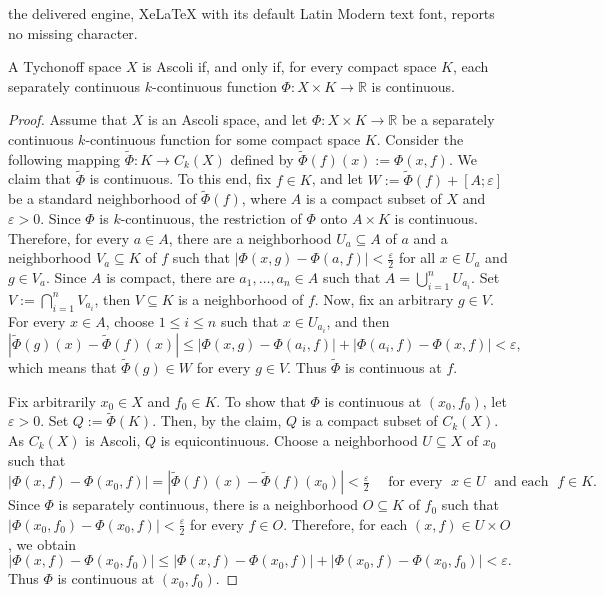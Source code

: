 \documentclass[10pt,a4paper]{amsart}
\newcommand{\CC}{C_k}
\newcommand{\IR}{\mathbb{R}}
\newcommand{\e}{\varepsilon}
\begin{document}
the delivered engine, XeLaTeX with its default Latin Modern text font, reports no missing character.
\begin{theorem} \label{t:Acoli-scf}
A Tychonoff space $X$ is Ascoli if, and only if, for every compact space $K$, each separately continuous $k$-continuous function $\Phi:X\times K\to \IR$ is continuous.
\end{theorem}

\begin{proof}
Assume that $X$ is an Ascoli space, and let $\Phi:X\times K\to \IR$ be a separately continuous $k$-continuous function for some compact space $K$. Consider the following mapping $\tilde\Phi: K\to \CC(X)$ defined by $\tilde\Phi(f)(x):=\Phi(x,f)$. We claim that $\tilde\Phi$ is continuous. To this end, fix $f\in K$, and let $W:=\tilde\Phi(f)+[A;\e]$ be a standard neighborhood of $\tilde\Phi(f)$, where  $A$ is a compact subset of $X$ and $\e>0$. Since $\Phi$ is $k$-continuous, the restriction of $\Phi$ onto $A\times K$ is continuous. Therefore, for every $a\in A$, there are a neighborhood $U_a\subseteq A$ of $a$ and a neighborhood $V_a\subseteq K$ of $f$ such that $|\Phi(x,g)-\Phi(a,f)|<\tfrac{\e}{2}$ for all $x\in U_a$ and $g\in V_a$. Since $A$ is compact, there are $a_1,\dots,a_n\in A$ such that $A=\bigcup_{i=1}^n U_{a_i}$. Set $V:=\bigcap_{i=1}^n V_{a_i}$, then $V\subseteq K$ is a neighborhood of $f$. Now, fix an arbitrary $g\in V$. For every $x\in A$, choose $1\leq i\leq n$ such that $x\in U_{a_i}$, and then
\[
|\tilde\Phi(g)(x)-\tilde\Phi(f)(x)|\leq |\Phi(x,g)-\Phi(a_i,f)|+|\Phi(a_i,f)-\Phi(x,f)|<\e,
\]
which means that  $\tilde\Phi(g)\in W$ for every $g\in V$. Thus $\tilde \Phi$ is continuous at $f$.

Fix arbitrarily $x_0\in X$ and $f_0\in K$. To show that $\Phi$  is continuous at $(x_0,f_0)$, let $\e>0$. Set $Q:=\tilde\Phi(K)$. Then, by the claim, $Q$ is a compact subset of $\CC(X)$. As $\CC(X)$ is Ascoli, $Q$ is equicontinuous.  Choose a neighborhood $U\subseteq X$ of $x_0$ such that
\[
|\Phi(x,f)-\Phi(x_0,f)|=|\tilde\Phi(f)(x)-\tilde\Phi(f)(x_0)|<\tfrac{\e}{2} \quad \mbox{ for every } \; x\in U\; \mbox{ and each } \; f\in K.
\]
Since $\Phi$ is separately continuous, there is a neighborhood $O\subseteq K$ of $f_0$ such that $|\Phi(x_0,f_0)-\Phi(x_0,f)|<\tfrac{\e}{2}$ for every $f\in O$. Therefore, for each $(x,f)\in U\times O$, we obtain
\[
|\Phi(x,f)-\Phi(x_0,f_0)|\leq |\Phi(x,f)-\Phi(x_0,f)|+|\Phi(x_0,f)-\Phi(x_0,f_0)|<\e.
\]
Thus $\Phi$ is continuous at $(x_0,f_0)$.
\smallskip


\end{proof}
\end{document}
